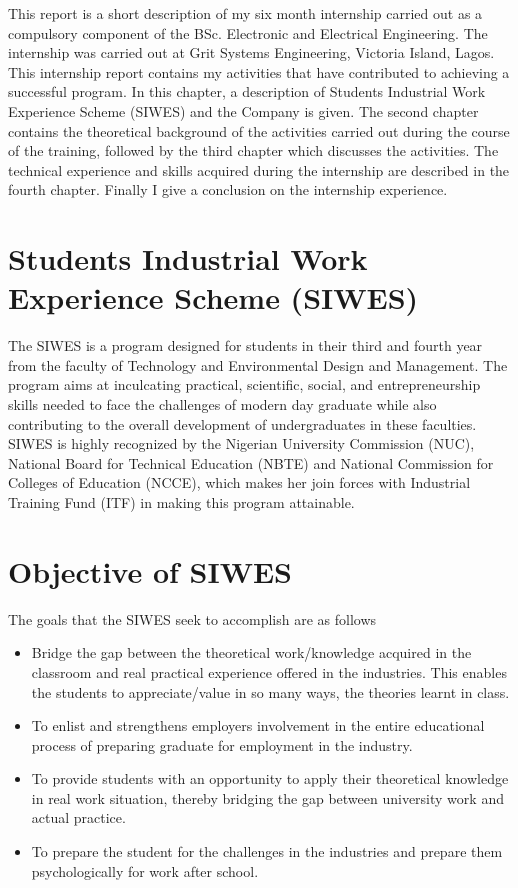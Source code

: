 This report is a short description of my six month internship carried out as a
compulsory component of the BSc. Electronic and Electrical Engineering. The
internship was carried out at Grit Systems Engineering, Victoria Island, Lagos.
This internship report contains my activities that have contributed to achieving a
successful program. In this chapter, a description of Students Industrial Work Experience
Scheme (SIWES) and the Company is given. The second chapter contains the
theoretical background of the activities carried out during the course of the training,
followed by the third chapter which discusses the activities. The technical experience
and skills acquired during the internship are described in the fourth chapter. Finally I
give a conclusion on the internship experience.

\section[SIWES]{Students Industrial Work Experience Scheme (\textbf{SIWES})}

The SIWES is a program designed for students in their third and fourth year from the faculty of Technology and
Environmental Design and Management. The program aims at inculcating practical,
scientific, social, and entrepreneurship skills needed to face the challenges of modern
day graduate while also contributing to the overall development of undergraduates in
these faculties. SIWES is highly recognized by the Nigerian University Commission
(NUC), National Board for Technical Education (NBTE) and National Commission
for Colleges of Education (NCCE), which makes her join forces with Industrial
Training Fund (ITF) in making this program attainable.

\section{Objective of SIWES} 

The goals that the SIWES seek to accomplish are as follows
\begin{itemize}
\item Bridge the gap between the theoretical work/knowledge acquired in the
classroom and real practical experience offered in the industries. This enables
the students to appreciate/value in so many ways, the theories learnt in class.
\item To enlist and strengthens employers involvement in the entire educational
process of preparing graduate for employment in the industry.
\item To provide students with an opportunity to apply their theoretical knowledge
in real work situation, thereby bridging the gap between university work and
actual practice.
\item To prepare the student for the challenges in the industries and prepare them
psychologically for work after school.
\end{itemize}

